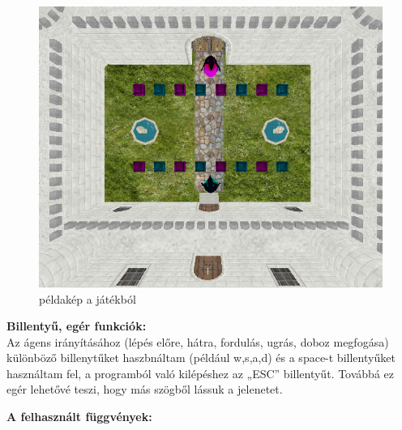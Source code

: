  
\begin{figure}[htp]
    \centering
   	\includegraphics[width=6truecm, height=4truecm]{images/game.png}
	\caption{példakép a játékból}
\end{figure}


{\bf Billentyű, egér funkciók:}\\

Az ágens irányításához (lépés előre, hátra, fordulás, ugrás, doboz megfogása) különböző billenytűket haszbnáltam (például w,s,a,d) és a space-t billentyűket használtam fel, a  programból való kilépéshez az „ESC” billentyűt. Továbbá ez egér lehetővé teszi, hogy más szögből lássuk a jelenetet.


{ \bf A felhasznált függvények:}

